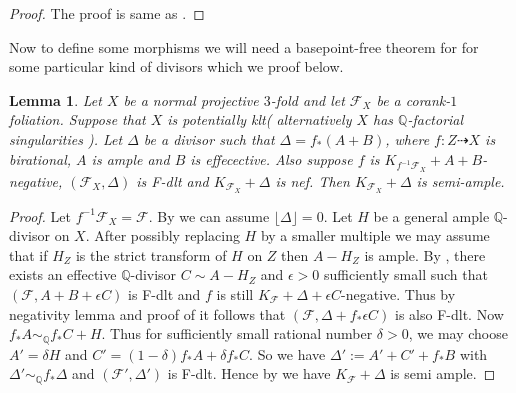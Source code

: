 \documentclass[12pt]{amsart}%
\theoremstyle{plain}
\newtheorem{lemma}[theorem]{Lemma}
\theoremstyle{remark}
\theoremstyle{definition}
\newcommand{\<}{\leq}
\newcommand{\mbQ}{\mathbb{Q}}
\theoremstyle{definition}
\theoremstyle{definition}
\numberwithin{equation}{section}
\theoremstyle{remark}
\begin{document}
\begin{proof}
    The proof is same as \cite[Corollary $3.11.3$]{BCHM}.
\end{proof}
Now to define some morphisms we will need a basepoint-free theorem for for some particular kind of divisors which we proof below.
\begin{lemma}\label{BPF}
    Let $X$ be a normal projective $3$-fold and let $\mathcal{F}_X$ be a corank-$1$ foliation. Suppose that $X$ is potentially klt( alternatively $X$ has $\mbQ$-factorial singularities ). Let $\Delta$ be a divisor such that $\Delta=f_*(A+B)$, where $f:Z\dashrightarrow X$ is birational, $A$ is ample and $B$ is effecective. Also suppose $f$ is $K_{f^{-1}\mathcal{F}_X}+A+B$-negative, $(\mathcal{F}_X,\Delta)$ is F-dlt and $K_{\mathcal{F}_X}+\Delta$ is nef. Then $K_{\mathcal{F}_X}+\Delta$ is semi-ample.
\end{lemma}
\begin{proof}
     Let $f^{-1}\mathcal{F}_X=\mathcal{F}$. By \cite[Lemma $3.26$]{CS21} we can assume $\lfloor \Delta\rfloor=0$. Let $H$ be a general ample $\mbQ$-divisor on $X$. After possibly replacing $H$ by a smaller multiple we may assume that if $H_Z$ is the strict transform of $H$ on $Z$ then $A-H_Z$ is ample. By \cite[Lemma $3.24$]{CS21}, there exists an effective $\mbQ$-divisor $C\sim A-H_Z$ and $\epsilon>0$ sufficiently small such that $(\mathcal{F},A+B+\epsilon C)$ is F-dlt and $f$ is still $K_{\mathcal{F}}+\Delta+\epsilon C$-negative. Thus by negativity lemma and proof of \cite[Lemma $3.11$]{CS21} it follows that $(\mathcal{F},\Delta+f_*\epsilon C)$ is also F-dlt. Now $f_*A\sim_{\mbQ}f_*C+H$. Thus for sufficiently small rational number $\delta>0$, we may choose $A'=\delta H$ and $C'=(1-\delta) f_*A+\delta f_*C$. So we have $\Delta':=A'+C'+f_*B$ with $\Delta'\sim_{\mbQ}f_*\Delta$ and $(\mathcal{F}',\Delta')$ is F-dlt. Hence by \cite[Theorem $9.4$]{CS21} we have $K_{\mathcal{F}}+\Delta$ is semi ample.
\end{proof}
\end{document}
